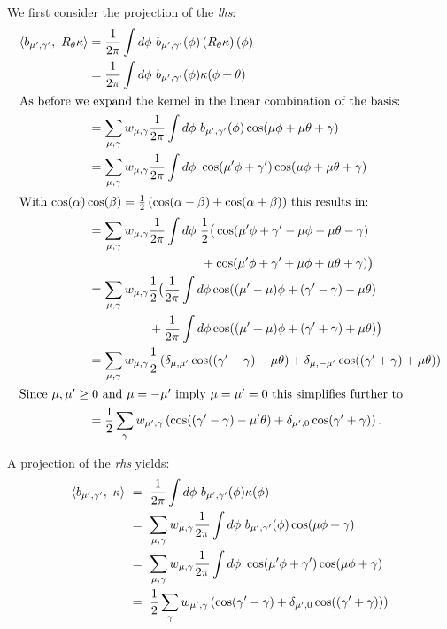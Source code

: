 \documentclass{article}
\newcommand{\lp}{\left(}
\newcommand{\rp}{\right)}
\begin{document}
We first consider the projection of the \textit{lhs}:
\begin{align*}
	\langle b_{\mu',\gamma'},\ R_{\theta} \kappa \rangle
	&= {1\over2\pi}\int d\phi \ b_{\mu',\gamma'}(\phi) \lp R_{\theta} \kappa\rp(\phi) \\
	&= {1\over2\pi}\int d\phi \ b_{\mu',\gamma'}(\phi) \kappa(\phi + \theta) \\
\intertext{As before we expand the kernel in the linear combination of the basis:}
	&= \sum_{\mu, \gamma} w_{\mu, \gamma} {1\over2\pi}\int d\phi \ b_{\mu',\gamma'}(\phi) \cos(\mu\phi + \mu\theta + \gamma) \\
	&= \sum_{\mu, \gamma} w_{\mu, \gamma} {1\over2\pi}\int d\phi \ \cos(\mu'\phi + \gamma') \cos(\mu\phi + \mu\theta + \gamma) \\
\intertext{With $\cos(\alpha)\cos(\beta) = {1\over2}\lp \cos(\alpha-\beta) + \cos(\alpha+\beta)\rp$ this results in:}
	&=\sum_{\mu, \gamma} w_{\mu, \gamma} {1\over2\pi}\int d\phi \ {1\over2}\big( \cos(\mu'\phi + \gamma' - \mu\phi-\mu\theta-\gamma) \\
	& \mkern164mu + \cos(\mu'\phi + \gamma' + \mu\phi+\mu\theta+\gamma) \big) \\
&= \sum_{\mu, \gamma} w_{\mu, \gamma} {1\over2}\big( {1\over2\pi}\int d\phi \cos((\mu' -\mu)\phi + (\gamma'-\gamma) - \mu\theta) \\
	& \mkern88mu + {1\over2\pi}\int d\phi  \cos((\mu' + \mu)\phi + (\gamma'+\gamma) + \mu\theta) \big)\\
	&= \sum_{\mu, \gamma} w_{\mu, \gamma} {1\over2}\lp \delta_{\mu, \mu'}\cos((\gamma'-\gamma) - \mu\theta) + \delta_{\mu, -\mu'}\cos((\gamma'+\gamma) + \mu\theta) \rp\\
\intertext{Since $\mu, \mu' \geq 0$ and $\mu = -\mu'$ imply $\mu = \mu' = 0$ this simplifies further to}
	&= {1\over2} \sum_{\gamma} w_{\mu', \gamma} \lp\cos((\gamma'-\gamma) - \mu'\theta) + \delta_{\mu', 0}\cos(\gamma'+\gamma) \rp.
\end{align*}

A projection of the \textit{rhs} yields:
\begin{align*}
\langle b_{\mu',\gamma'},\ \kappa \rangle
	&\ =\ {1\over2\pi}\int d\phi \ b_{\mu',\gamma'}(\phi) \kappa(\phi) \\
&\ =\ \sum_{\mu, \gamma} w_{\mu, \gamma} {1\over2\pi}\int d\phi \ b_{\mu',\gamma'}(\phi) \cos(\mu\phi + \gamma) \\
	&\ =\ \sum_{\mu, \gamma} w_{\mu, \gamma} {1\over2\pi}\int d\phi \ \cos(\mu'\phi + \gamma') \cos(\mu\phi + \gamma) \\
	&\ =\ {1\over2} \sum_{\gamma} w_{\mu', \gamma} \lp\cos(\gamma'-\gamma) + \delta_{\mu', 0}\cos((\gamma'+\gamma)) \rp
\end{align*}
\end{document}
